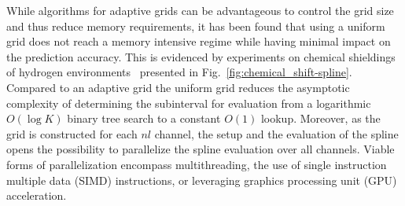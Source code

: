 While algorithms for adaptive grids can be advantageous to control the grid size and thus reduce memory requirements, it has been found that using a uniform grid does not reach a memory intensive regime while having minimal impact on the prediction accuracy.
This is evidenced by experiments on chemical shieldings of hydrogen environments~\cite{paruzzo2018chemical} presented in Fig.~\ref{fig:chemical_shift-spline}.
Compared to an adaptive grid the uniform grid reduces the asymptotic complexity of determining the subinterval for evaluation from a logarithmic $O(\log K)$ binary tree search to a constant $O(1)$ lookup.
Moreover, as the grid is constructed for each $nl$ channel, the setup and the evaluation of the spline opens the possibility to parallelize the spline evaluation over all channels.
Viable forms of parallelization encompass multithreading, the use of single instruction multiple data (SIMD) instructions, or leveraging graphics processing unit (GPU) acceleration.

